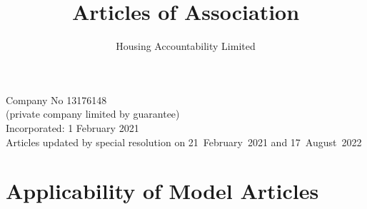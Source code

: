 \documentclass[10pt]{mk-articles-of-association}
\newcommand{\Name}[0]{Housing Accountability Limited}
\begin{document}
\title{
Articles of Association\\
}
\author{\Name{}\\
}
\date{}

\maketitle

\begin{center}
Company No 13176148\\
(private company limited by guarantee)\\
\medskip
Incorporated: 1 February 2021 \\
\medskip
Articles updated by special resolution on 21~February~2021 and 17~August~2022
\end{center}



\section*{Applicability of Model Articles}
\end{document}
